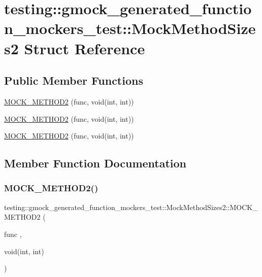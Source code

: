 \hypertarget{structtesting_1_1gmock__generated__function__mockers__test_1_1_mock_method_sizes2}{}\section{testing\+::gmock\+\_\+generated\+\_\+function\+\_\+mockers\+\_\+test\+::Mock\+Method\+Sizes2 Struct Reference}
\label{structtesting_1_1gmock__generated__function__mockers__test_1_1_mock_method_sizes2}
\subsection*{Public Member Functions}
\begin{DoxyCompactItemize}
\item 
\mbox{\hyperlink{structtesting_1_1gmock__generated__function__mockers__test_1_1_mock_method_sizes2_a9200d3c0d5cbabb2bb93da4827b84260}{M\+O\+C\+K\+\_\+\+M\+E\+T\+H\+O\+D2}} (func, void(int, int))
\item 
\mbox{\hyperlink{structtesting_1_1gmock__generated__function__mockers__test_1_1_mock_method_sizes2_a9200d3c0d5cbabb2bb93da4827b84260}{M\+O\+C\+K\+\_\+\+M\+E\+T\+H\+O\+D2}} (func, void(int, int))
\item 
\mbox{\hyperlink{structtesting_1_1gmock__generated__function__mockers__test_1_1_mock_method_sizes2_a9200d3c0d5cbabb2bb93da4827b84260}{M\+O\+C\+K\+\_\+\+M\+E\+T\+H\+O\+D2}} (func, void(int, int))
\end{DoxyCompactItemize}


\subsection{Member Function Documentation}
\mbox{\label{structtesting_1_1gmock__generated__function__mockers__test_1_1_mock_method_sizes2_a9200d3c0d5cbabb2bb93da4827b84260}} 
\subsubsection{\texorpdfstring{MOCK\_METHOD2()}{MOCK\_METHOD2()}\hspace{0.1cm}{\footnotesize\ttfamily [1/3]}}
{\footnotesize\ttfamily testing\+::gmock\+\_\+generated\+\_\+function\+\_\+mockers\+\_\+test\+::\+Mock\+Method\+Sizes2\+::\+M\+O\+C\+K\+\_\+\+M\+E\+T\+H\+O\+D2 (\begin{DoxyParamCaption}\item[{func}]{,  }\item[{void(int, int)}]{ }\end{DoxyParamCaption})}

